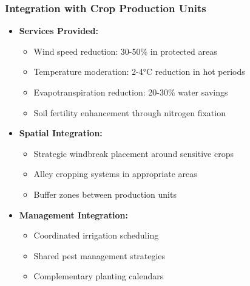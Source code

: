 \subsubsection{Integration with Crop Production Units}
\begin{itemize}
    \item \textbf{Services Provided:}
    \begin{itemize}
        \item Wind speed reduction: 30-50\% in protected areas
        \item Temperature moderation: 2-4°C reduction in hot periods
        \item Evapotranspiration reduction: 20-30\% water savings
        \item Soil fertility enhancement through nitrogen fixation
    \end{itemize}
    \item \textbf{Spatial Integration:}
    \begin{itemize}
        \item Strategic windbreak placement around sensitive crops
        \item Alley cropping systems in appropriate areas
        \item Buffer zones between production units
    \end{itemize}
    \item \textbf{Management Integration:}
    \begin{itemize}
        \item Coordinated irrigation scheduling
        \item Shared pest management strategies
        \item Complementary planting calendars
    \end{itemize}
\end{itemize}

